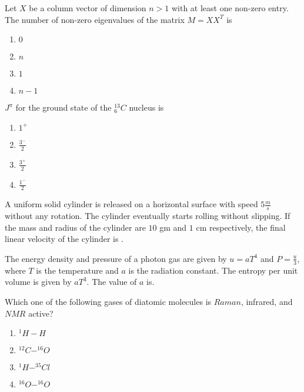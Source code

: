 
\iffalse
    \title{Assignment}
    \author{EE24BTECH11034}
    \section{ph}
    \chapter{2017}
  \fi
\item Let $X$ be a column vector of dimension $n > 1$ with at least one non-zero entry. The number of non-zero eigenvalues of the matrix $M = XX^T$ is

\begin{enumerate}
    \item $0$
    \item $n$
    \item $1$
    \item $n-1$
\end{enumerate}

\item $J^\pi$ for the ground state of the $^{13}_6C$ nucleus is

\begin{enumerate}
    \item $1^+$
    \item $\frac{3^-}{2}$
    \item $\frac{3^+}{2}$
    \item $\frac{1^-}{2}$
\end{enumerate}

\item A uniform solid cylinder is released on a horizontal surface with speed $5 \frac{m}{s}$ without any rotation. The cylinder eventually starts rolling without slipping. If the mass and radius of the cylinder are $10$ gm and $1$ cm respectively, the final linear velocity of the cylinder is .

\item The energy density and pressure of a photon gas are given by $u = aT^4$ and $P = \frac{u}{3}$, where $T$ is the temperature and $a$ is the radiation constant. The entropy per unit volume is given by $aT^3$. The value of $a$ is.

\item Which one of the following gases of diatomic molecules is $Raman$, infrared, and $NMR$ active?

\begin{enumerate}
    \item $^1H-H$
    \item $^{12}C-^{16}O$
    \item $^1H-^{35}Cl$
    \item $^{16}O-^{16}O$
\end{enumerate}

